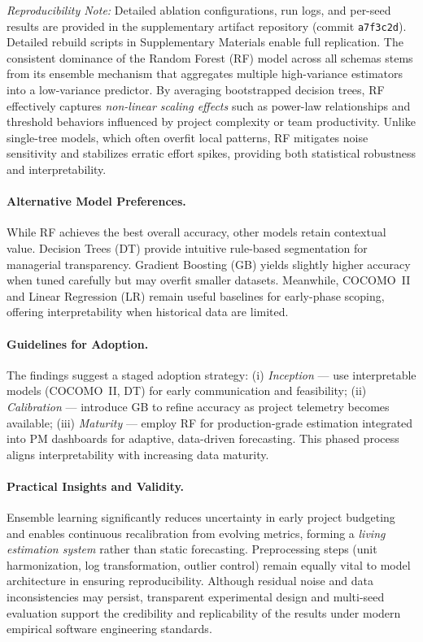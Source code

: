\documentclass{ieeeaccess}
\begin{document}
\noindent
\textit{Reproducibility Note:} Detailed ablation configurations, run logs, 
and per-seed results are provided in the supplementary artifact repository 
(commit \texttt{a7f3c2d}). Detailed rebuild scripts in Supplementary Materials enable full replication.
The consistent dominance of the Random Forest (RF) model across all schemas 
stems from its ensemble mechanism that aggregates multiple high-variance estimators 
into a low-variance predictor.  
By averaging bootstrapped decision trees, RF effectively captures 
\textit{non-linear scaling effects} such as power-law relationships 
and threshold behaviors influenced by project complexity or team productivity.  
Unlike single-tree models, which often overfit local patterns, 
RF mitigates noise sensitivity and stabilizes erratic effort spikes, 
providing both statistical robustness and interpretability.  

\paragraph{Alternative Model Preferences.}
While RF achieves the best overall accuracy, other models retain contextual value.  
Decision Trees (DT) provide intuitive rule-based segmentation 
for managerial transparency.  
Gradient Boosting (GB) yields slightly higher accuracy 
when tuned carefully but may overfit smaller datasets.  
Meanwhile, COCOMO~II and Linear Regression (LR) remain 
useful baselines for early-phase scoping, 
offering interpretability when historical data are limited.  

\paragraph{Guidelines for Adoption.}
The findings suggest a staged adoption strategy:  
(i) \textit{Inception} --- use interpretable models (COCOMO~II, DT) 
for early communication and feasibility;  
(ii) \textit{Calibration} --- introduce GB to refine accuracy 
as project telemetry becomes available;  
(iii) \textit{Maturity} --- employ RF for production-grade estimation 
integrated into PM dashboards for adaptive, data-driven forecasting.  
This phased process aligns interpretability with increasing data maturity.  

\paragraph{Practical Insights and Validity.}
Ensemble learning significantly reduces uncertainty in early project budgeting 
and enables continuous recalibration from evolving metrics, 
forming a \textit{living estimation system} rather than static forecasting.  
Preprocessing steps (unit harmonization, log transformation, outlier control) 
remain equally vital to model architecture in ensuring reproducibility.  
Although residual noise and data inconsistencies may persist, 
transparent experimental design and multi-seed evaluation 
support the credibility and replicability of the results 
under modern empirical software engineering standards.  
\end{document}
